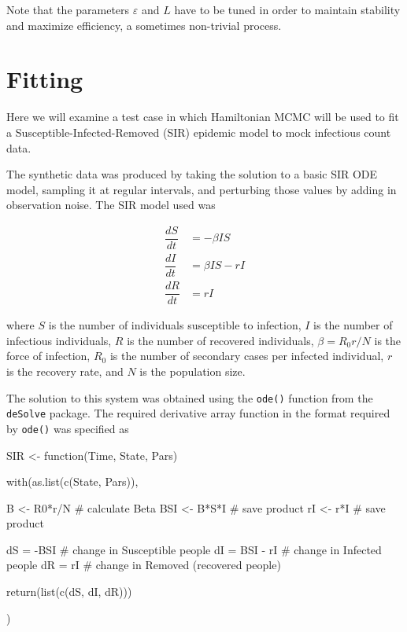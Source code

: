     Note that the parameters $\varepsilon$ and $L$ have to be tuned in order to maintain stability and maximize efficiency, a sometimes non-trivial process.
    

\section{Fitting}

    Here we will examine a test case in which Hamiltonian MCMC will be used to fit a Susceptible-Infected-Removed (SIR) epidemic model to mock infectious count data.

    The synthetic data was produced by taking the solution to a basic SIR ODE model, sampling it at regular intervals, and perturbing those values by adding in observation noise. The SIR model used was

    \begin{equation}
        \begin{array}{rl}
            \dfrac{dS}{dt} & = - \beta I S \\
            \dfrac{dI}{dt} & = \beta I S - rI  \\
            \dfrac{dR}{dt} & = rI
        \end{array}
    \end{equation}

    where $S$ is the number of individuals susceptible to infection, $I$ is the number of infectious individuals, $R$ is the number of recovered individuals, $\beta = R_0 r / N$ is the force of infection, $R_0$ is the number of secondary cases per infected individual, $r$ is the recovery rate, and $N$ is the population size.

    The solution to this system was obtained using the \verb|ode()| function from the \verb|deSolve| package. The required derivative array function in the format required by \verb|ode()| was specified as

    \begin{R}    
    SIR <- function(Time, State, Pars) {

        with(as.list(c(State, Pars)), {
            
            B   <- R0*r/N    # calculate Beta
            BSI <- B*S*I     # save product
            rI  <- r*I       # save product
            
            dS = -BSI       # change in Susceptible people
            dI = BSI - rI   # change in Infected people
            dR = rI         # change in Removed (recovered people)
            
            return(list(c(dS, dI, dR)))
            
        })
        
    }
    \end{R}

